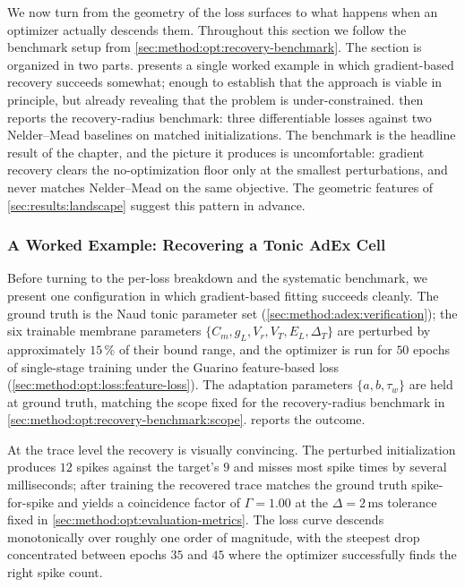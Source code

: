 We now turn from the geometry of the loss surfaces to what happens when an optimizer actually descends them.
Throughout this section we follow the benchmark setup from \cref{sec:method:opt:recovery-benchmark}.
The section is organized in two parts.
 presents a single worked example in which gradient-based recovery succeeds somewhat;
enough to establish that the approach is viable in principle, but already revealing that the problem is under-constrained.
 then reports the recovery-radius benchmark: three differentiable losses against two Nelder--Mead baselines on matched initializations.
The benchmark is the headline result of the chapter, and the picture it produces is uncomfortable:
gradient recovery clears the no-optimization floor only at the smallest perturbations, and never matches Nelder--Mead on the same objective.
The geometric features of \cref{sec:results:landscape} suggest this pattern in advance.

\subsubsection{A Worked Example: Recovering a Tonic AdEx Cell}\label{sec:results:positive-example}
Before turning to the per-loss breakdown and the systematic benchmark, we present one configuration in which gradient-based fitting succeeds cleanly.
The ground truth is the Naud tonic parameter set (\cref{sec:method:adex:verification}); the six trainable membrane parameters $\{C_m, g_L, V_r, V_T, E_L, \Delta_T\}$ are perturbed by approximately $15\,\%$ of their bound range, and the optimizer is run for $50$ epochs of single-stage training under the Guarino feature-based loss (\cref{sec:method:opt:loss:feature-loss}).
The adaptation parameters $\{a, b, \tau_w\}$ are held at ground truth, matching the scope fixed for the recovery-radius benchmark in \cref{sec:method:opt:recovery-benchmark:scope}.
 reports the outcome.

At the trace level the recovery is visually convincing.
The perturbed initialization produces $12$ spikes against the target's $9$ and misses most spike times by several milliseconds;
after training the recovered trace matches the ground truth spike-for-spike and yields a coincidence factor of $\Gamma = 1.00$ at the $\Delta = 2\,\text{ms}$ tolerance fixed in \cref{sec:method:opt:evaluation-metrics}.
The loss curve descends monotonically over roughly one order of magnitude, with the steepest drop concentrated between epochs $35$ and $45$ where the optimizer successfully finds the right spike count.

